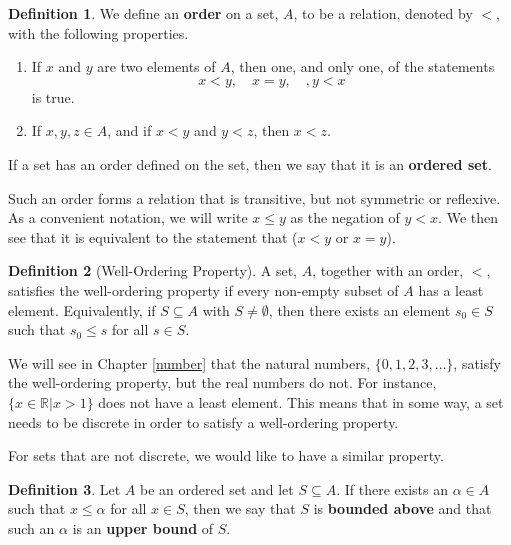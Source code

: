 \documentclass[
]{book}
\providecommand{\tightlist}{%
  \setlength{\itemsep}{0pt}\setlength{\parskip}{0pt}}
\theoremstyle{definition}
\newtheorem{definition}{Definition}[chapter]
\theoremstyle{definition}
\theoremstyle{definition}
\theoremstyle{definition}
\theoremstyle{remark}
\begin{document}
\begin{definition}
\protect\hypertarget{def:order}{}\label{def:order}We define an \textbf{order} on a set, \(A\), to be a relation, denoted by \(<\), with the following properties.

\begin{enumerate}
\def\labelenumi{\arabic{enumi}.}
\tightlist
\item
  If \(x\) and \(y\) are two elements of \(A\), then one, and only one, of the statements \[x<y, \quad x=y, \quad, y<x\] is true.
\item
  If \(x,y,z \in A\), and if \(x<y\) and \(y<z\), then \(x<z\).
\end{enumerate}

If a set has an order defined on the set, then we say that it is an \textbf{ordered set}.
\end{definition}

Such an order forms a relation that is transitive, but not symmetric or reflexive. As a convenient notation, we will write \(x\leq y\) as the negation of \(y<x\). We then see that it is equivalent to the statement that (\(x<y\) or \(x=y\)).

\begin{definition}[Well-Ordering Property]
\protect\hypertarget{def:well-ordering}{}\label{def:well-ordering}A set, \(A\), together with an order, \(<\), satisfies the well-ordering property if every non-empty subset of \(A\) has a least element. Equivalently, if \(S\subseteq A\) with \(S\neq \emptyset\), then there exists an element \(s_0\in S\) such that \(s_0 \leq s\) for all \(s\in S\).
\end{definition}

We will see in Chapter \ref{number} that the natural numbers, \(\{0,1,2,3,\ldots\}\), satisfy the well-ordering property, but the real numbers do not. For instance, \(\{x\in \mathbb{R}\vert x>1\}\) does not have a least element. This means that in some way, a set needs to be discrete in order to satisfy a well-ordering property.

For sets that are not discrete, we would like to have a similar property.

\begin{definition}
Let \(A\) be an ordered set and let \(S\subseteq A\). If there exists an \(\alpha \in A\) such that \(x\leq \alpha\) for all \(x\in S\), then we say that \(S\) is \textbf{bounded above} and that such an \(\alpha\) is an \textbf{upper bound} of \(S\).
\end{definition}
\end{document}
